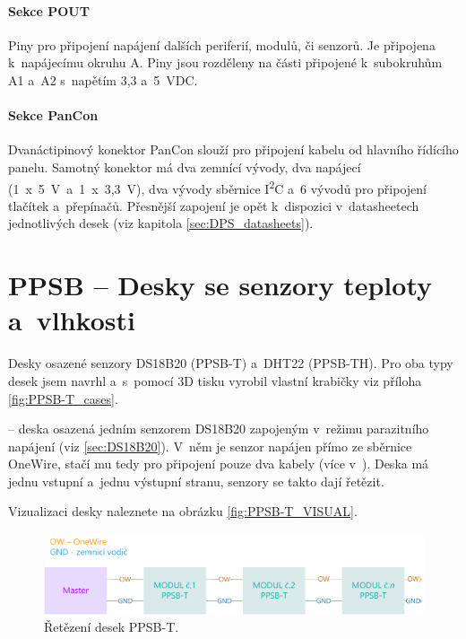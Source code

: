 \paragraph{Sekce POUT} 
Piny pro připojení napájení dalších periferií, modulů, či senzorů.
Je připojena k~napájecímu okruhu A.
Piny jsou rozděleny na části připojené k~subokruhům A1 a~A2 s~napětím 3,3 a~5~VDC.

\paragraph{Sekce PanCon}
Dvanáctipinový konektor PanCon slouží pro připojení kabelu od hlavního řídícího panelu. 
Samotný konektor má dva zemnící vývody, dva napájecí (1~x~5~V~a~1~x~3,3~V), dva vývody sběrnice I\textsuperscript{2}C a~6 vývodů pro připojení tlačítek a~přepínačů.
Přesnější zapojení je opět k~dispozici v~datasheetech jednotlivých desek (viz kapitola \ref{sec:DPS_datasheets}).

\section{PPSB -- Desky se senzory teploty a~vlhkosti}
Desky osazené senzory DS18B20\cite{DS18B20} (PPSB-T) a~DHT22\cite{DHT22} (PPSB-TH).
Pro oba typy desek jsem navrhl a~s~pomocí 3D tisku vyrobil vlastní krabičky viz příloha \ref{fig:PPSB-T_cases}.\newline

\noindent{} -- deska osazená jedním senzorem DS18B20 \cite{DS18B20} zapojeným v~režimu parazitního napájení (viz \autoref{sec:DS18B20}).
V~něm je senzor napájen přímo ze sběrnice OneWire, stačí mu tedy pro připojení pouze dva kabely (více v~\cite{DS18B20}).
Deska má jednu vstupní a~jednu výstupní stranu, senzory se takto dají řetězit.

Vizualizaci desky naleznete na obrázku \ref{fig:PPSB-T_VISUAL}.\newline \newline

\begin{figure}[h]
    \centering
   \includegraphics[width=\textwidth]{img/HARDWARE/PPSB-T_CHAIN.png}
   \caption{Řetězení desek PPSB-T.}
   \label{fig:PPSB-T_wiring}
\end{figure}

